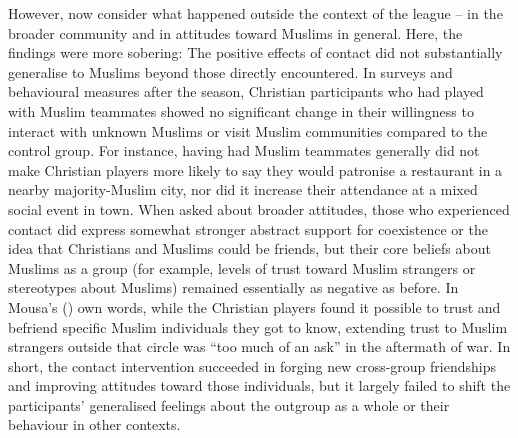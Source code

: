 \documentclass[
  letterpaper,
]{book}
\begin{document}
However, now consider what happened outside the context of the league --
in the broader community and in attitudes toward Muslims in general.
Here, the findings were more sobering: The positive effects of contact
did not substantially generalise to Muslims beyond those directly
encountered. In surveys and behavioural measures after the season,
Christian participants who had played with Muslim teammates showed no
significant change in their willingness to interact with unknown Muslims
or visit Muslim communities compared to the control group. For instance,
having had Muslim teammates generally did not make Christian players
more likely to say they would patronise a restaurant in a nearby
majority-Muslim city, nor did it increase their attendance at a mixed
social event in town. When asked about broader attitudes, those who
experienced contact did express somewhat stronger abstract support for
coexistence or the idea that Christians and Muslims could be friends,
but their core beliefs about Muslims as a group (for example, levels of
trust toward Muslim strangers or stereotypes about Muslims) remained
essentially as negative as before. In Mousa's
() own words, while the
Christian players found it possible to trust and befriend specific
Muslim individuals they got to know, extending trust to Muslim strangers
outside that circle was ``too much of an ask'' in the aftermath of war.
In short, the contact intervention succeeded in forging new cross-group
friendships and improving attitudes toward those individuals, but it
largely failed to shift the participants' generalised feelings about the
outgroup as a whole or their behaviour in other contexts.
\end{document}
